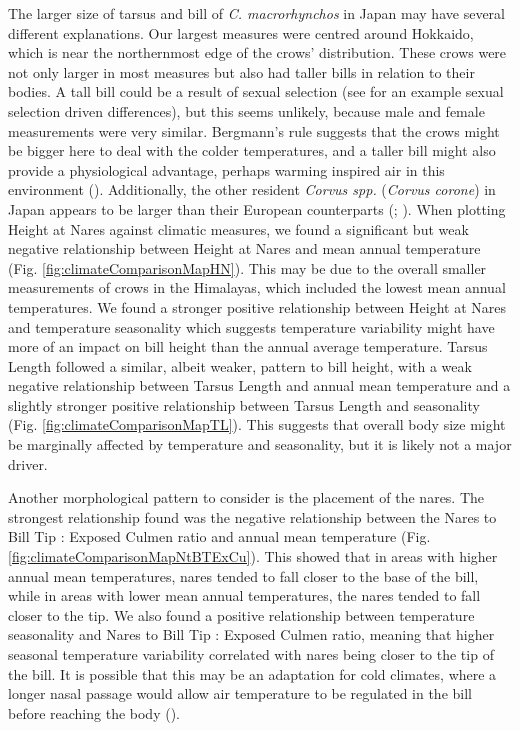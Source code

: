 \documentclass[10pt,a4paper]{article}
\begin{document}
The larger size of tarsus and bill of \emph{C. macrorhynchos} in Japan may have several different explanations.
Our largest measures were centred around Hokkaido, which is near the northernmost edge of the crows' distribution.
These crows were not only larger in most measures but also had taller bills in relation to their bodies.
A tall bill could be a result of sexual selection (see  for an example sexual selection driven differences), but this seems unlikely, because male and female measurements were very similar.
Bergmann's rule suggests that the crows might be bigger here to deal with the colder temperatures, and a taller bill might also provide a physiological advantage, perhaps warming inspired air in this environment ().
Additionally, the other resident \emph{Corvus spp.} (\emph{Corvus corone}) in Japan appears to be larger than their European counterparts (; ).
When plotting Height at Nares against climatic measures, we found a significant but weak negative relationship between Height at Nares and mean annual temperature (Fig. \ref{fig:climateComparisonMapHN}).
This may be due to the overall smaller measurements of crows in the Himalayas, which included the lowest mean annual temperatures.
We found a stronger positive relationship between Height at Nares and temperature seasonality which suggests temperature variability might have more of an impact on bill height than the annual average temperature.
Tarsus Length followed a similar, albeit weaker, pattern to bill height, with a weak negative relationship between Tarsus Length and annual mean temperature and a slightly stronger positive relationship between Tarsus Length and seasonality (Fig. \ref{fig:climateComparisonMapTL}).
This suggests that overall body size might be marginally affected by temperature and seasonality, but it is likely not a major driver.

Another morphological pattern to consider is the placement of the nares.
The strongest relationship found was the negative relationship between the Nares to Bill Tip : Exposed Culmen ratio and annual mean temperature (Fig. \ref{fig:climateComparisonMapNtBTExCu}).
This showed that in areas with higher annual mean temperatures, nares tended to fall closer to the base of the bill, while in areas with lower mean annual temperatures, the nares tended to fall closer to the tip.
We also found a positive relationship between temperature seasonality and Nares to Bill Tip : Exposed Culmen ratio, meaning that higher seasonal temperature variability correlated with nares being closer to the tip of the bill.
It is possible that this may be an adaptation for cold climates, where a longer nasal passage would allow air temperature to be regulated in the bill before reaching the body ().
\end{document}
